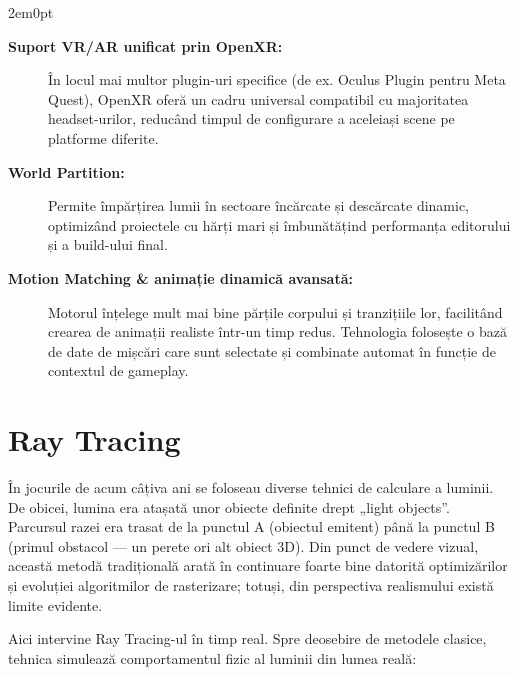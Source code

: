 \begin{adjustwidth}{2em}{0pt}
\begin{description}
    \item[\textbf{Suport VR/AR unificat prin OpenXR: }] În locul mai multor plugin-uri specifice (de ex. Oculus Plugin pentru Meta Quest), OpenXR oferă un cadru universal compatibil cu majoritatea headset-urilor, reducând timpul de configurare a aceleiași scene pe platforme diferite.
    \item[\textbf{{World Partition: }}] Permite împărțirea lumii în sectoare încărcate și descărcate dinamic, optimizând proiectele cu hărți mari și îmbunătățind performanța editorului și a build-ului final.
    \item[\textbf{{Motion Matching \& animație dinamică avansată: }}] Motorul înțelege mult mai bine părțile corpului și tranzițiile lor, facilitând crearea de animații realiste într-un timp redus. Tehnologia folosește o bază de date de mișcări care sunt selectate și combinate automat în funcție de contextul de gameplay.
\end{description}
\end{adjustwidth}

\section{Ray Tracing}

În jocurile de acum câțiva ani se foloseau diverse tehnici de calculare a luminii. De obicei, lumina era atașată unor obiecte definite drept „light objects”. Parcursul razei era trasat de la punctul A (obiectul emitent) până la punctul B (primul obstacol — un perete ori alt obiect 3D). Din punct de vedere vizual, această metodă tradițională arată în continuare foarte bine datorită optimizărilor și evoluției algoritmilor de rasterizare; totuși, din perspectiva realismului există limite evidente.

Aici intervine Ray Tracing-ul în timp real. Spre deosebire de metodele clasice, tehnica simulează comportamentul fizic al luminii din lumea reală:

